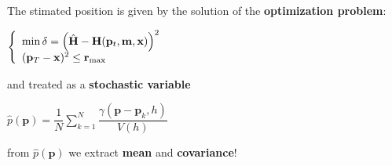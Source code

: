 {\begin{columns}[c]
\begin{block}{}
\begin{algorithm}[H]
	\end{algorithm}
	\vspace{0.75cm}

	\end{block}
	\begin{block}{}
		\vspace{0.75cm}
		The stimated position is given by the solution of the \textbf{optimization problem}:
		\vspace{0.5cm}
		
		$\left\{\begin{array}{l}\mathrm{min}\, \delta = \left( \hat{\mathbf{H}} - \mathbf{H}(\mathbf{p}_t, \mathbf{m}, \mathbf{x}) \right)^2 \\ (\mathbf{p}_T-\mathbf{x})^2 \leq \mathbf{r}_{\mathrm{max}}\end{array}\right.$
		\vspace{0.5cm}
		
		and treated as a \textbf{stochastic variable}
		\vspace{1cm}
		
		$\hat{p}(\mathbf{p}) = \dfrac{1}{N}\sum\limits_{k=1}^{N} \dfrac{\gamma(\mathbf{p}-\mathbf{p}_k,h)}{V(h)}$

		\vspace{1cm}
		from $\hat{p}(\mathbf{p})$ we extract \textbf{mean} and \textbf{covariance}!
		\vspace{0.90cm}
	\end{block}
	\end{columns}
}